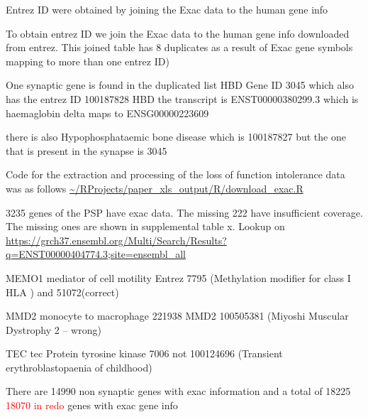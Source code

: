 Entrez ID were obtained by joining the Exac data to the human gene info 




To obtain entrez ID we join the Exac data to the human gene info downloaded from entrez. This joined table has 8 duplicates as a result of Exac gene symbols mapping to more than one entrez ID)

One synaptic gene is found in the duplicated list HBD Gene ID 3045 which also has the entrez ID 100187828 
HBD
the transcript is ENST00000380299.3 which is haemaglobin delta maps to ENSG00000223609

there is also Hypophosphataemic bone disease which is 100187827 but the one that is present in the synapse is 3045


Code for the extraction and processing of the loss of function intolerance data was as follows 
\url{~/RProjects/paper_xls_output/R/download_exac.R}

3235 genes of the PSP have exac data. The missing 222 have insufficient coverage. The missing ones are shown in supplemental table x.
Lookup on \url{https://grch37.ensembl.org/Multi/Search/Results?q=ENST00000404774.3;site=ensembl_all}

MEMO1 mediator of cell motility Entrez 7795 (Methylation modifier for class I HLA
) and 51072(correct)

MMD2 monocyte to macrophage 221938 MMD2 100505381 (Miyoshi Muscular Dystrophy 2 – wrong)

TEC tec Protein tyrosine kinase 7006 not 100124696 (Transient erythroblastopaenia of childhood)

There are 14990 non synaptic genes with exac information and a total of 18225 \textcolor{red}{18070 in redo} genes with exac gene info


 



